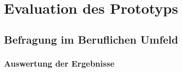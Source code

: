 \chapter{Evaluation des Prototyps}
%
%
\section{Befragung im Beruflichen Umfeld}
%
%
\subsection{Auswertung der Ergebnisse}
